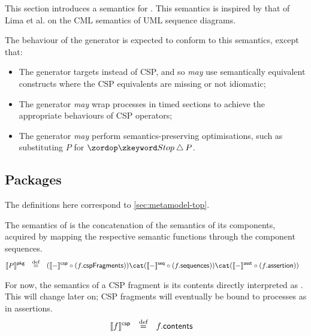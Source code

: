 
This section introduces a \tockcsp{} semantics for \langname.
This semantics is inspired by that of Lima et al. on the CML semantics of
UML sequence diagrams.

The behaviour of the \langname{} generator is expected to conform to
this semantics, except that:

\begin{itemize}
\item
	The generator targets \cspm{} instead of CSP, and so \emph{may}
	use semantically equivalent \cspm{} constructs where the CSP equivalents
	are missing or not idiomatic;
\item
	The generator \emph{may}  wrap processes in
	timed sections to achieve the appropriate \tockcsp{} behaviours of
	CSP operators;
\item
	The generator \emph{may} perform semantics-preserving optimisations,
	such as substituting \(P\) for \(\Stop \interrupt P\).
\end{itemize}


\subsection{Packages}\label{ssec:semantics-tockcsp-top}

The definitions here correspond to \cref{sec:metamodel-top}.

\begin{defn}[\mrapackage]
The semantics of \mrapackage{} is the concatenation of the semantics of its
components, acquired by mapping the respective semantic functions through the
component sequences.
%
\begin{align*}
	\pkgsema{\apkg}
\quad\defeq\quad&
	(\cspsema{-} \circ (\field{\acsp}{cspFragments}))
\cat
	(\seqsema{-} \circ (\field{\acsp}{sequences}))
\cat
	(\asstsema{-} \circ (\field{\acsp}{assertion}))
\end{align*}
\end{defn}

\begin{defn}[\mcspfragment]
For now, the semantics of a CSP fragment is its contents directly interpreted
as \tockcsp.  This will change later on; CSP fragments will eventually be bound
to processes as in \robochart{} assertions.
%
\begin{align*}
	\llbracket f \rrbracket^{\mathsf{csp}}
\quad\mathbin{\overset{\text{def}}=}\quad&
	f.\mathsf{contents}
\end{align*}
\end{defn}


